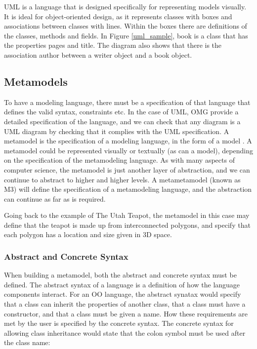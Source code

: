 \ac{UML} is a language that is designed specifically for representing models visually. It is ideal for object-oriented design, as it represents classes with boxes and associations between classes with lines. Within the boxes there are definitions of the classes, methods and fields. In Figure \ref{uml_sample}, book is a class that has the properties pages and title. The diagram also shows that there is the association author between a writer object and a book object.

\subsection{Metamodels}
To have a modeling language, there must be a specification of that language that defines the valid syntax, constraints etc. In the case of \ac{UML}, \ac{OMG} provide a detailed specification \citep{umlSpec} of the language, and we can check that any diagram is a \ac{UML} diagram by checking that it complies with the \ac{UML} specification.
A metamodel is the specification of a modeling language, in the form of a model \citep{brambillaBook}. A metamodel could be represented visually or textually (as can a model), depending on the specification of the metamodeling language. As with many aspects of computer science, the metamodel is just another layer of abstraction, and we can continue to abstract to higher and higher levels. A metametamodel (known as M3) will define the specification of a metamodeling language, and the abstraction can continue as far as is required.

Going back to the example of The Utah Teapot, the metamodel in this case may define that the teapot is made up from interconnected polygons, and specify that each polygon has a location and size given in 3D space. 

\subsubsection{Abstract and Concrete Syntax}

When building a metamodel, both the abstract and concrete syntax must be defined. The abstract syntax of a language is a definition of how the language components interact. For an OO language, the abstract synatax would specify that a class can inherit the properties of another class, that a class must have a constructor, and that a class must be given a name. How these requirements are met by the user is specified by the concrete syntax. The concrete syntax for allowing class inheritance would state that the colon symbol must be used after the class name:

